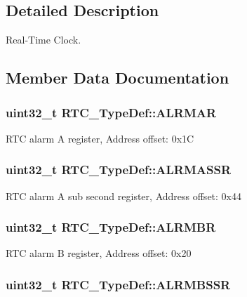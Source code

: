 \subsection{Detailed Description}
Real-\/\-Time Clock. 

\subsection{Member Data Documentation}
\hypertarget{struct_r_t_c___type_def_ad7e54d5c5a4b9fd1e26aca85b1e36c7f}{
\subsubsection[{A\-L\-R\-M\-A\-R}]{ uint32\-\_\-t R\-T\-C\-\_\-\-Type\-Def\-::\-A\-L\-R\-M\-A\-R}}\label{struct_r_t_c___type_def_ad7e54d5c5a4b9fd1e26aca85b1e36c7f}
R\-T\-C alarm A register, Address offset\-: 0x1\-C \hypertarget{struct_r_t_c___type_def_ac5b2e3c0dcdcb569f3fe15dfe3794bc1}{
\subsubsection[{A\-L\-R\-M\-A\-S\-S\-R}]{ uint32\-\_\-t R\-T\-C\-\_\-\-Type\-Def\-::\-A\-L\-R\-M\-A\-S\-S\-R}}\label{struct_r_t_c___type_def_ac5b2e3c0dcdcb569f3fe15dfe3794bc1}
R\-T\-C alarm A sub second register, Address offset\-: 0x44 \hypertarget{struct_r_t_c___type_def_a9816616e1f00955c8982469d0dd9c953}{
\subsubsection[{A\-L\-R\-M\-B\-R}]{ uint32\-\_\-t R\-T\-C\-\_\-\-Type\-Def\-::\-A\-L\-R\-M\-B\-R}}\label{struct_r_t_c___type_def_a9816616e1f00955c8982469d0dd9c953}
R\-T\-C alarm B register, Address offset\-: 0x20 \hypertarget{struct_r_t_c___type_def_a249009cd672e7bcd52df1a41de4619e1}{
\subsubsection[{A\-L\-R\-M\-B\-S\-S\-R}]{ uint32\-\_\-t R\-T\-C\-\_\-\-Type\-Def\-::\-A\-L\-R\-M\-B\-S\-S\-R}}\label{struct_r_t_c___type_def_a249009cd672e7bcd52df1a41de4619e1}
